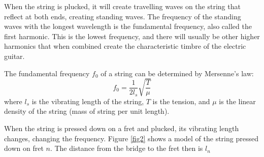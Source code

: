 When the string is plucked, it will create travelling waves on the string that reflect at both ends, creating standing waves. The frequency of the standing waves with the longest wavelength is the fundamental frequency, also called the first harmonic. This is the lowest frequency, and there will usually be other higher harmonics that when combined create the characteristic timbre of the electric guitar.

The fundamental frequency $f_0$ of a string can be determined by Mersenne's law:
\begin{equation}\label{eqn1}
    f_0 = \frac{1}{2l_s}\sqrt{\frac{T}{\mu}}
\end{equation}
where $l_s$ is the vibrating length of the string, $T$ is the tension, and $\mu$ is the linear density of the string (mass of string per unit length). \cite{mersenne} \par
When the string is pressed down on a fret and plucked, its vibrating length changes, changing the frequency. Figure \ref{fig2} shows a model of the string pressed down on fret $n$. The distance from the bridge to the fret then is $l_n$

